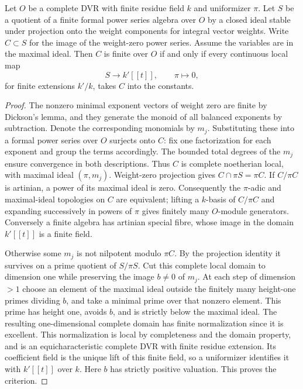 \begin{lemma}\label{dp:detect}
Let \(O\) be a complete DVR with finite residue field \(k\) and
uniformizer \(\pi\). Let \(S\) be a quotient of a finite formal
power series algebra over \(O\) by a closed ideal stable under
projection onto the weight components for integral vector weights.
Write \(C\subset S\) for the image of the weight-zero power series.
Assume the variables are in the maximal ideal. Then \(C\) is finite
over \(O\) if and only if every continuous local map
\[
               S\longrightarrow k'[[t]],\qquad \pi\longmapsto 0,
\]
for finite extensions \(k'/k\), takes \(C\) into the constants.
\end{lemma}
\begin{proof}
The nonzero minimal exponent vectors of weight zero are finite
by Dickson's lemma, and they generate the monoid of all balanced
exponents by subtraction. Denote the corresponding monomials by
\(m_j\). Substituting these into a formal power series over \(O\)
surjects onto \(C\): fix one factorization for each exponent and
group the terms accordingly. The bounded total degrees of the
\(m_j\) ensure convergence in both descriptions. Thus \(C\) is
complete noetherian local, with maximal ideal \((\pi,m_j)\).
Weight-zero projection gives \(C\cap\pi S=\pi C\).
If \(C/\pi C\) is artinian, a power of its maximal ideal is zero.
Consequently the \(\pi\)-adic and maximal-ideal topologies on \(C\)
are equivalent; lifting a \(k\)-basis of \(C/\pi C\) and expanding
successively in powers of \(\pi\) gives finitely many \(O\)-module
generators. Conversely a finite algebra has artinian special fibre,
whose image in the domain \(k'[[t]]\) is a finite field.

Otherwise some \(m_j\) is not nilpotent modulo \(\pi C\). By the
projection identity it survives on a prime quotient of \(S/\pi S\).
Cut this complete local domain to dimension one while preserving
the image \(b\ne0\) of \(m_j\). At each step of dimension \(>1\)
choose an element of the maximal ideal outside the finitely many
height-one primes dividing \(b\), and take a minimal prime over
that nonzero element. This prime has height one, avoids \(b\), and
is strictly below the maximal ideal. The resulting one-dimensional
complete domain has finite normalization since it is excellent.
This normalization is local by completeness and the domain property,
and is an equicharacteristic complete DVR with finite residue
extension. Its coefficient field is the unique lift of this finite
field, so a uniformizer identifies it with \(k'[[t]]\) over \(k\).
Here \(b\) has strictly positive valuation. This proves the criterion.
\end{proof}

